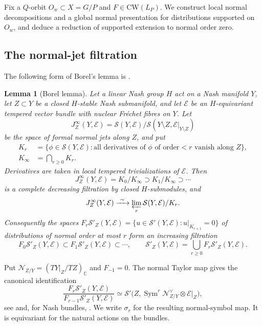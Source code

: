\documentclass[a4paper,12pt]{amsart}
\numberwithin{equation}{section}
\newtheorem{lemma}[theorem]{Lemma}
\theoremstyle{definition}
\theoremstyle{remark}
\newcommand{\C}{\mathbb C}
\newcommand{\mcS}{\mathcal S}
\newcommand{\mcE}{\mathcal E}
\newcommand{\Sym}{\operatorname{Sym}}
\begin{document}
Fix a $Q$-orbit $O_w\subset X=G/P$ and $F\in\mathrm{CW}(L_P)$. We construct local normal decompositions and a global normal presentation for distributions supported on $O_w$, and deduce a reduction of supported extension to normal order zero.

\subsection{The normal-jet filtration}\label{ssec:borel}

The following form of Borel's lemma is \cite[Proposition~8.2 and Proposition~8.3]{CS21}.

\begin{lemma}[Borel lemma]\label{lem:Borel}
Let a linear Nash group $H$ act on a Nash manifold $Y$, let $Z\subset Y$ be a closed $H$-stable Nash submanifold, and let $\mcE$ be an $H$-equivariant tempered vector bundle with nuclear Fr\'echet fibres on $Y$. Let
\[
 J^\infty_Z(Y,\mcE)=\mcS(Y,\mcE)/\mcS(Y\setminus Z,\mcE|_{Y\setminus Z})
\]
be the space of formal normal jets along $Z$, and put
\[
\begin{aligned}
 K_r&=\{\phi\in\mcS(Y,\mcE):\text{all derivatives of }\phi\text{ of order}<r\text{ vanish along }Z\},\\
 K_\infty&=\bigcap_{r\ge0}K_r.
\end{aligned}
\]
Derivatives are taken in local tempered trivializations of $\mcE$. Then
\[
 J^\infty_Z(Y,\mcE)=K_0/K_\infty\supset K_1/K_\infty\supset\cdots
\]
is a complete decreasing filtration by closed $H$-submodules, and
\[
 J^\infty_Z(Y,\mcE)\xrightarrow{\ \sim\ }\varprojlim_r\mcS(Y,\mcE)/K_r.
\]
Consequently the spaces $F_r\mcS'_Z(Y,\mcE)=\{u\in\mcS'(Y,\mcE):u|_{K_{r+1}}=0\}$ of distributions of normal order at most $r$ form an increasing filtration
\[
 F_0\mcS'_Z(Y,\mcE)\subset F_1\mcS'_Z(Y,\mcE)\subset\cdots,\qquad \mcS'_Z(Y,\mcE)=\bigcup_{r\ge0}F_r\mcS'_Z(Y,\mcE).
\]
\end{lemma}

Put $\mathcal N_{Z/Y}=(TY|_Z/TZ)_\C$ and $F_{-1}=0$. The normal Taylor map gives the canonical identification
\begin{equation}\label{eq:normal-symbol}
 \frac{F_r\mcS'_Z(Y,\mcE)}{F_{r-1}\mcS'_Z(Y,\mcE)}
 \simeq\mcS'\bigl(Z,\Sym^r\mathcal N_{Z/Y}^\vee\otimes\mcE|_Z\bigr),
\end{equation}
see \cite[Proposition~8.3]{CS21} and, for Nash bundles, \cite[Lemma~5.5.3 and Corollary~5.5.4]{AG08}. We write $\sigma_r$ for the resulting normal-symbol map. It is equivariant for the natural actions on the bundles.
\end{document}
